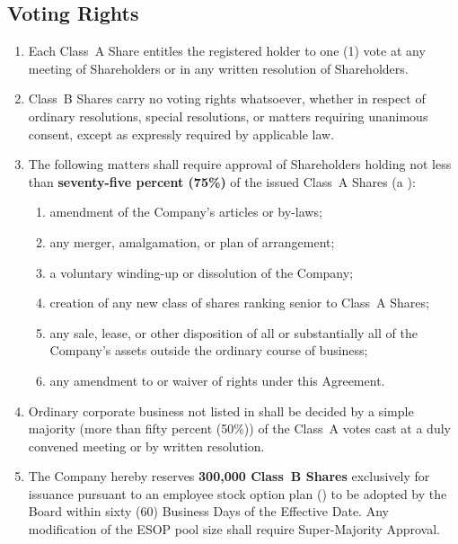 \subsection{Voting Rights}

\begin{enumerate}[leftmargin=*, label=\textbf{3.\arabic*.}, itemsep=4pt]
  \item Each Class~A Share entitles the registered holder to one (1) vote at any
        meeting of Shareholders or in any written resolution of Shareholders.

  \item Class~B Shares carry no voting rights whatsoever, whether in respect of
        ordinary resolutions, special resolutions, or matters requiring unanimous
        consent, except as expressly required by applicable law.

  \item The following matters shall require approval of Shareholders holding not
        less than \textbf{seventy-five percent (75\%)} of the issued Class~A Shares
        (a ):
        \begin{enumerate}[label=\lbrack\alph*\rbrack, leftmargin=2em, itemsep=2pt]
          \item amendment of the Company's articles or by-laws;
          \item any merger, amalgamation, or plan of arrangement;
          \item a voluntary winding-up or dissolution of the Company;
          \item creation of any new class of shares ranking senior to Class~A Shares;
          \item any sale, lease, or other disposition of all or substantially all
                of the Company's assets outside the ordinary course of business;
          \item any amendment to or waiver of rights under this Agreement.
        \end{enumerate}

  \item Ordinary corporate business not listed in  shall be decided by
        a simple majority (more than fifty percent (50\%)) of the Class~A votes
        cast at a duly convened meeting or by written resolution.

  \item The Company hereby reserves \textbf{300{,}000 Class~B Shares} exclusively for
        issuance pursuant to an employee stock option plan () to be
        adopted by the Board within sixty (60) Business Days of the Effective Date.
        Any modification of the ESOP pool size shall require Super-Majority Approval.
\end{enumerate}

